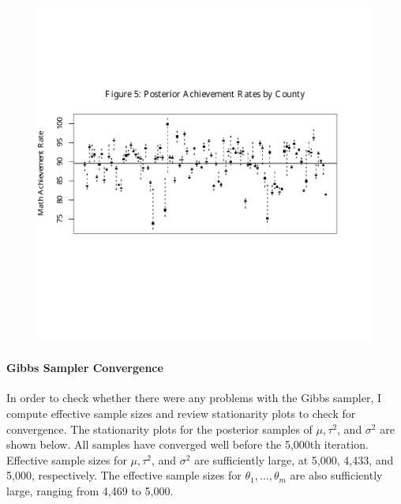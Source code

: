 \documentclass[11pt]{article}
\begin{document}
\begin{figure}[H]
\centering
    \includegraphics[trim= 0in 2in 0in 1.75in,clip,scale=0.8]{theta_post}
\end{figure}

\paragraph{Gibbs Sampler Convergence} In order to check whether there were any problems with the Gibbs sampler, I compute effective sample sizes and review stationarity plots to check for convergence.  The stationarity plots for the posterior samples of $\mu, \tau^2$, and $\sigma^2$ are shown below.  All samples have converged well before the 5,000th iteration.  Effective sample sizes for $\mu, \tau^2$, and $\sigma^2$ are sufficiently large, at 5,000, 4,433, and 5,000, respectively.  The effective sample sizes for $\theta_1,...,\theta_m$ are also sufficiently large, ranging from 4,469 to 5,000.
\end{document}
